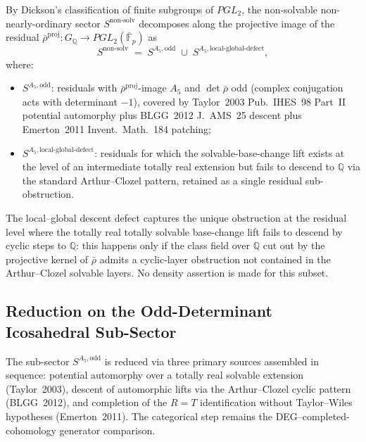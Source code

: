 \begin{definition}
\label{v4-arith:w10-f:def:A5-sub-sectors}
By Dickson's classification of finite
subgroups of \(PGL_{2}\), the non-solvable non-nearly-ordinary sector
\(S^{\mathrm{non\text{-}solv}}\) decomposes along the projective image
of the residual \(\bar\rho^{\mathrm{proj}}\colon G_{\mathbb{Q}}\to
PGL_{2}(\overline{\mathbb{F}}_{p})\) as
\[
S^{\mathrm{non\text{-}solv}}\;=\;S^{A_{5},\mathrm{odd}}\;\cup\;
S^{A_{5},\mathrm{local\text{-}global\text{-}defect}},
\]
where:
\begin{itemize}
\item \(S^{A_{5},\mathrm{odd}}\): residuals with
\(\bar\rho^{\mathrm{proj}}\)-image \(A_{5}\) and \(\det\bar\rho\) odd
(complex conjugation acts with determinant \(-1\)), covered by
Taylor~2003 Pub.~IHES~98 Part~II potential automorphy plus
BLGG~2012 J.~AMS~25 descent plus Emerton~2011 Invent.~Math.~184
patching;
\item \(S^{A_{5},\mathrm{local\text{-}global\text{-}defect}}\): residuals
for which the solvable-base-change lift exists at the level of an
intermediate totally real extension but fails to descend to \(\mathbb{Q}\)
via the standard Arthur--Clozel pattern, retained as a single
residual sub-obstruction.
\end{itemize}
\end{definition}

\begin{remark}
\label{v4-arith:w10-f:rem:ns-defect-density}
The local--global descent defect captures the unique obstruction at
the residual level where the totally real totally solvable base-change
lift fails to descend by cyclic steps to \(\mathbb{Q}\): this happens
only if the class field over \(\mathbb{Q}\) cut out by the projective
kernel of \(\bar\rho\) admits a cyclic-layer obstruction not contained
in the Arthur--Clozel solvable layers. No density assertion is made
for this subset.
\end{remark}

\subsection{Reduction on the Odd-Determinant Icosahedral Sub-Sector}
\label{v4-arith:w10-f:ns-odd}

The sub-sector \(S^{A_{5},\mathrm{odd}}\) is reduced via three primary
sources assembled in sequence: potential automorphy over a totally
real solvable extension (Taylor~2003), descent of automorphic lifts
via the Arthur--Clozel cyclic pattern (BLGG~2012), and completion of
the \(R=T\) identification without Taylor--Wiles hypotheses
(Emerton~2011). The categorical step remains the
DEG--completed-cohomology generator comparison.

